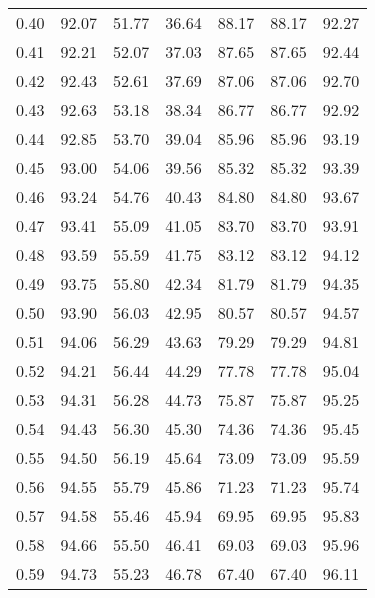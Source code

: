 \begin{tabular}{|c|c|c|c|c|c|c|}
      0.40 &     92.07 &     51.77 &      36.64 &   88.17 &      88.17 &         92.27 \\
      0.41 &     92.21 &     52.07 &      37.03 &   87.65 &      87.65 &         92.44 \\
      0.42 &     92.43 &     52.61 &      37.69 &   87.06 &      87.06 &         92.70 \\
      0.43 &     92.63 &     53.18 &      38.34 &   86.77 &      86.77 &         92.92 \\
      0.44 &     92.85 &     53.70 &      39.04 &   85.96 &      85.96 &         93.19 \\
      0.45 &     93.00 &     54.06 &      39.56 &   85.32 &      85.32 &         93.39 \\
      0.46 &     93.24 &     54.76 &      40.43 &   84.80 &      84.80 &         93.67 \\
      0.47 &     93.41 &     55.09 &      41.05 &   83.70 &      83.70 &         93.91 \\
      0.48 &     93.59 &     55.59 &      41.75 &   83.12 &      83.12 &         94.12 \\
      0.49 &     93.75 &     55.80 &      42.34 &   81.79 &      81.79 &         94.35 \\
      0.50 &     93.90 &     56.03 &      42.95 &   80.57 &      80.57 &         94.57 \\
      0.51 &     94.06 &     56.29 &      43.63 &   79.29 &      79.29 &         94.81 \\
      0.52 &     94.21 &     56.44 &      44.29 &   77.78 &      77.78 &         95.04 \\
      0.53 &     94.31 &     56.28 &      44.73 &   75.87 &      75.87 &         95.25 \\
      0.54 &     94.43 &     56.30 &      45.30 &   74.36 &      74.36 &         95.45 \\
      0.55 &     94.50 &     56.19 &      45.64 &   73.09 &      73.09 &         95.59 \\
      0.56 &     94.55 &     55.79 &      45.86 &   71.23 &      71.23 &         95.74 \\
      0.57 &     94.58 &     55.46 &      45.94 &   69.95 &      69.95 &         95.83 \\
      0.58 &     94.66 &     55.50 &      46.41 &   69.03 &      69.03 &         95.96 \\
      0.59 &     94.73 &     55.23 &      46.78 &   67.40 &      67.40 &         96.11 \\

\end{tabular}
